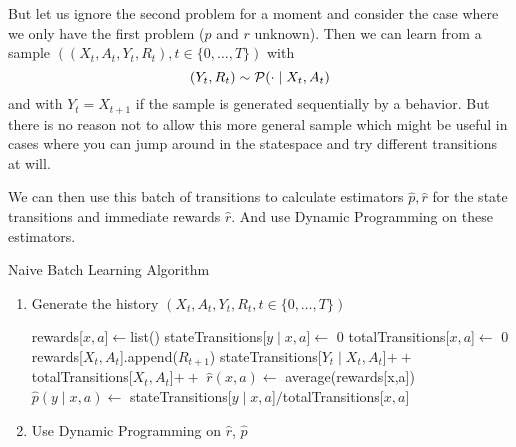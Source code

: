 But let us ignore the second problem for a moment and consider the case where we only have the first problem (\(p\) and \(r\) unknown). Then we can learn from a sample \(((X_t, A_t, Y_t, R_t), t\in\{0,\dots, T\})\) with
\[
	(Y_t,R_t)\sim \mathcal{P}(\cdot \mid X_t, A_t)
\]
and with \(Y_t=X_{t+1}\) if the sample is generated sequentially by a behavior. But there is no reason not to allow this more general sample which might be useful in cases where you can jump around in the statespace and try different transitions at will. 

We can then use this batch of transitions to calculate estimators \(\hat{p},\hat{r}\) for the state transitions and immediate rewards \(\hat{r}\). And use Dynamic Programming on these estimators.



\begin{algorithm}
	\caption{Naive Batch Learning Algorithm} \label{naive batch learning algorithm}
	\begin{enumerate}
		\item Generate the history \((X_t, A_t, Y_t, R_t, t\in\{0,\dots, T\})\)
		\begin{algorithmic}[1] 
			 
				\State rewards[\(x,a\)]\(\gets\)list() 
				\State stateTransitions[\(y\mid x,a\)]\(\gets\) 0
				\State totalTransitions[\(x,a\)]\(\gets\) 0
			\EndFor
				\State rewards[\(X_t,A_t\)].append(\(R_{t+1}\))
				\State stateTransitions[\(Y_t\mid X_t,A_t\)]\(++\) \label{algo1: incr 1}
				\State totalTransitions[\(X_t,A_t\)]\(++\)\label{algo1: incr 2}
			\EndFor
				\State \(\hat{r}(x,a) \gets\) average(rewards[x,a])
					\State \(\hat{p}(y\mid x,a)\gets\) stateTransitions[\(y\mid x,a\)]\(/\)totalTransitions[\(x,a\)]\label{calculation of hat p}
				\EndFor
			\EndFor
		\end{algorithmic}
		\item Use Dynamic Programming on \(\hat{r}\), \(\hat{p}\) 
	\end{enumerate}
\end{algorithm}

